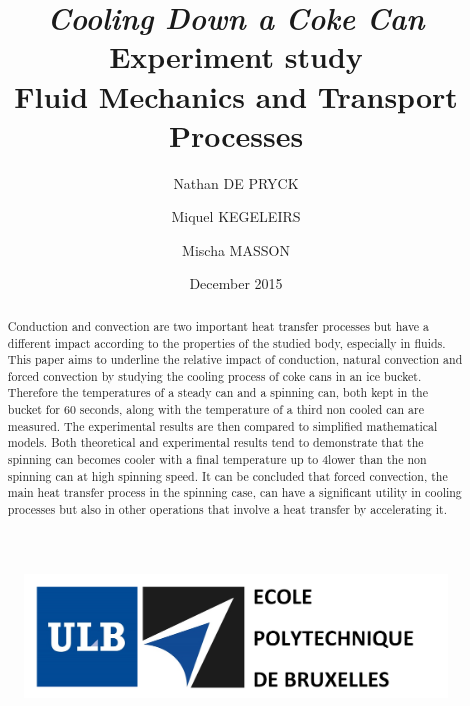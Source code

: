 \documentclass{report}
\title{\Huge\emph{Cooling Down a Coke Can}\\
	\LARGE Experiment study\\
	\vspace{11pt}
	\large Fluid Mechanics and Transport Processes}
\date{December 2015}
\author{Nathan DE PRYCK \and Miquel KEGELEIRS \and Mischa MASSON}
\begin{document}
	
	\begin{figure}[t]
		\includegraphics[width=15cm]{img/entete.PNG}
	\end{figure}
	
	\maketitle
	
	\renewcommand{\abstractname}{``Cooling down a coke can'' \\Experiment study by Nathan De Pryck, Miquel Kegeleirs and Mischa Masson\\ Université Libre de Bruxelles\\2015-2016.}
	
	\BgThispage
	
	\begin{abstract}
	
	Conduction and convection are two important heat transfer processes but have a different impact according to the properties of the studied body, especially in fluids. 
	This paper aims to underline the relative impact of conduction, natural convection and forced convection by studying the cooling process of coke cans in an ice bucket.
	Therefore the temperatures of a steady can and a spinning can, both kept in the bucket for 60 seconds, along with the temperature of a third non cooled can are measured.
	The experimental results are then compared to simplified mathematical models.
	Both theoretical and experimental results tend to demonstrate that the spinning can becomes cooler with a final temperature up to 4\texcelcius lower than the non spinning can at high spinning speed.
	It can be concluded that forced convection, the main heat transfer process in the spinning case, can have a significant utility in cooling processes but also in other operations that involve a heat transfer by accelerating it.
	
	\end{abstract}
	
	\clearpage
	
	\tableofcontents
	\listoffigures
	
\end{document}
